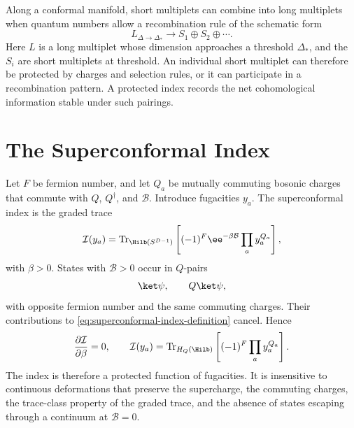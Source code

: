 Along a conformal manifold, short multiplets can combine into long multiplets
when quantum numbers allow a recombination rule of the schematic form
\[
  L_{\Delta\to\Delta_*}
  \longrightarrow
  S_1\oplus S_2\oplus\cdots .
\]
Here \(L\) is a long multiplet whose dimension approaches a threshold
\(\Delta_*\), and the \(S_i\) are short multiplets at threshold.  An individual
short multiplet can therefore be protected by charges and selection rules, or
it can participate in a recombination pattern.  A protected index records the
net cohomological information stable under such pairings.

\section{The Superconformal Index}

Let \(F\) be fermion number, and let \(Q_a\) be mutually commuting bosonic
charges that commute with \(Q\), \(Q^\dagger\), and \(\mathcal B\).  Introduce
fugacities \(y_a\).  The superconformal index is the graded trace
\begin{equation}
  \mathcal I(y_a)
  =
  \operatorname{Tr}_{\Hilb(S^{D-1})}
  \left[
    (-1)^F
    \ee^{-\beta\mathcal B}
    \prod_a y_a^{Q_a}
  \right],
  \label{eq:superconformal-index-definition}
\end{equation}
with \(\beta>0\).  States with \(\mathcal B>0\) occur in \(Q\)-pairs
\[
  \ket\psi,\qquad Q\ket\psi,
\]
with opposite fermion number and the same commuting charges.  Their
contributions to \eqref{eq:superconformal-index-definition} cancel.  Hence
\[
  \frac{\partial\mathcal I}{\partial\beta}=0,
  \qquad
  \mathcal I(y_a)
  =
  \operatorname{Tr}_{H_Q(\Hilb)}
  \left[
    (-1)^F\prod_a y_a^{Q_a}
  \right].
\]
The index is therefore a protected function of fugacities.  It is insensitive
to continuous deformations that preserve the supercharge, the commuting
charges, the trace-class property of the graded trace, and the absence of
states escaping through a continuum at \(\mathcal B=0\).

